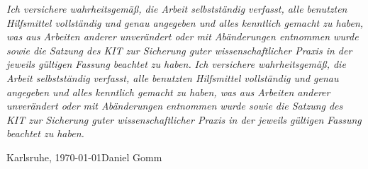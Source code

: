 \mbox{}\thispagestyle{empty}

\vspace*{1cm}

{\Large \textbf{}} 

\bigskip

{
\textit{Ich versichere wahrheitsgemäß, die Arbeit selbstständig verfasst, alle benutzten Hilfsmittel vollständig und genau angegeben und alles kenntlich gemacht zu haben, was aus Arbeiten anderer unverändert oder mit Abänderungen entnommen wurde sowie die Satzung des KIT zur Sicherung guter wissenschaftlicher Praxis in der jeweils gültigen Fassung beachtet zu haben.}}
{
\textit{Ich versichere wahrheitsgemäß, die Arbeit selbstständig verfasst, alle benutzten Hilfsmittel vollständig und genau angegeben und alles kenntlich gemacht zu haben, was aus Arbeiten anderer unverändert oder mit Abänderungen entnommen wurde sowie die Satzung des KIT zur Sicherung guter wissenschaftlicher Praxis in der jeweils gültigen Fassung beachtet zu haben.}}

\vspace{1cm}

%
%
%
%
Karlsruhe, \today \hfill Daniel Gomm


